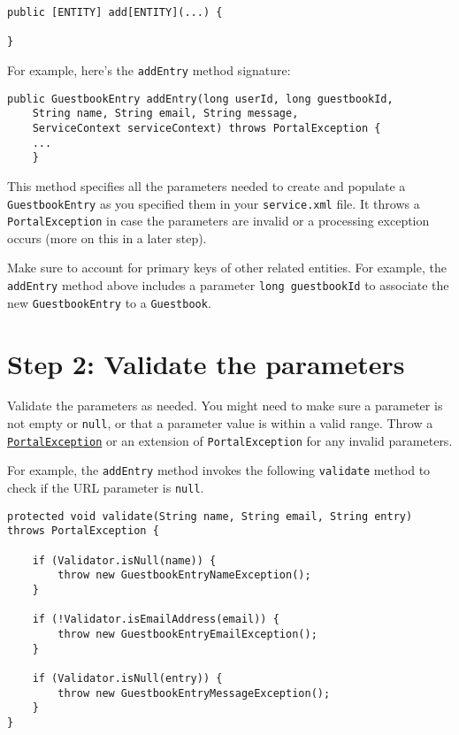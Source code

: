 \begin{verbatim}
public [ENTITY] add[ENTITY](...) {
    
} 
\end{verbatim}

For example, here's the \texttt{addEntry} method signature:

\begin{verbatim}
public GuestbookEntry addEntry(long userId, long guestbookId, 
    String name, String email, String message, 
    ServiceContext serviceContext) throws PortalException {
    ...
    }
\end{verbatim}

This method specifies all the parameters needed to create and populate a
\texttt{GuestbookEntry} as you specified them in your
\texttt{service.xml} file. It throws a \texttt{PortalException} in case
the parameters are invalid or a processing exception occurs (more on
this in a later step).

Make sure to account for primary keys of other related entities. For
example, the \texttt{addEntry} method above includes a parameter
\texttt{long\ guestbookId} to associate the new \texttt{GuestbookEntry}
to a \texttt{Guestbook}.

\section{Step 2: Validate the
parameters}\label{step-2-validate-the-parameters}

Validate the parameters as needed. You might need to make sure a
parameter is not empty or \texttt{null}, or that a parameter value is
within a valid range. Throw a
\href{https://docs.liferay.com/dxp/portal/7.2-latest/javadocs/portal-kernel/com/liferay/portal/kernel/exception/PortalException.html}{\texttt{PortalException}}
or an extension of \texttt{PortalException} for any invalid parameters.

For example, the \texttt{addEntry} method invokes the following
\texttt{validate} method to check if the URL parameter is \texttt{null}.

\begin{verbatim}
protected void validate(String name, String email, String entry) throws PortalException {

    if (Validator.isNull(name)) {
        throw new GuestbookEntryNameException();
    }

    if (!Validator.isEmailAddress(email)) {
        throw new GuestbookEntryEmailException();
    }

    if (Validator.isNull(entry)) {
        throw new GuestbookEntryMessageException();
    }
}
\end{verbatim}

